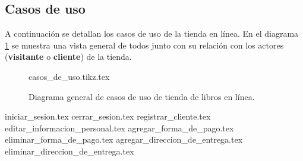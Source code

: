%
%

\subsection{Casos de uso}

A continuación se detallan los casos de uso de la tienda en línea. En el
diagrama \ref{lib_casos_de_uso_general} se muestra una vista
general de todos junto con su relación con los actores (\textbf{visitante} o
\textbf{cliente}) de la tienda.

\begin{figure}
  \begin{center}
    {casos_de_uso.tikz.tex}
    \caption{Diagrama general de casos de uso de tienda de libros en línea.}
    \label{lib_casos_de_uso_general}
  \end{center}
\end{figure}

{iniciar_sesion.tex}
{cerrar_sesion.tex}
{registrar_cliente.tex}
{editar_informacion_personal.tex}
{agregar_forma_de_pago.tex}
{eliminar_forma_de_pago.tex}
{agregar_direccion_de_entrega.tex}
{eliminar_direccion_de_entrega.tex}

